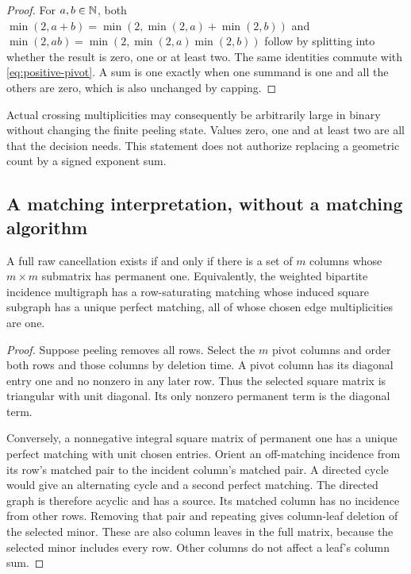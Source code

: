 \begin{proof}
For $a,b\in\mathbb N$, both
$\min(2,a+b)=\min(2,\min(2,a)+\min(2,b))$ and
$\min(2,ab)=\min(2,\min(2,a)\min(2,b))$ follow by splitting into whether
the result is zero, one or at least two. The same identities commute
with \eqref{eq:positive-pivot}. A sum is one exactly when one summand is
one and all the others are zero, which is also unchanged by capping.
\end{proof}

Actual crossing multiplicities may consequently be arbitrarily large in
binary without changing the finite peeling state. Values zero, one and
at least two are all that the decision needs. This statement does not
authorize replacing a geometric count by a signed exponent sum.

\subsection{A matching interpretation, without a matching algorithm}

\begin{corollary}
\label{cor:matching}
A full raw cancellation exists if and only if there is a set of $m$
columns whose $m\times m$ submatrix has permanent one. Equivalently,
the weighted bipartite incidence multigraph has a row-saturating matching
whose induced square subgraph has a unique perfect matching, all of whose
chosen edge multiplicities are one.
\end{corollary}

\begin{proof}
Suppose peeling removes all rows. Select the $m$ pivot columns and order
both rows and those columns by deletion time. A pivot column has its
diagonal entry one and no nonzero in any later row. Thus the selected
square matrix is triangular with unit diagonal. Its only nonzero
permanent term is the diagonal term.

Conversely, a nonnegative integral square matrix of permanent one has a
unique perfect matching with unit chosen entries. Orient an off-matching
incidence from its row's matched pair to the incident column's matched
pair. A directed cycle would give an alternating cycle and a second
perfect matching. The directed graph is therefore acyclic and has a
source. Its matched column has no incidence from other rows. Removing
that pair and repeating gives column-leaf deletion of the selected minor.
These are also column leaves in the full matrix, because the selected
minor includes every row. Other columns do not affect a leaf's column sum.
\end{proof}

